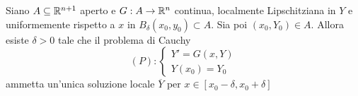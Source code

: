 \begin{theorem} \label{Teo: Esistenza e unicità locale}
    Siano $A \subseteq \mathbb{R}^{n+1}$ aperto e $G:A \to \mathbb{R}^n$ continua, localmente Lipschitziana in $Y$ e uniformemente rispetto a $x$ in $B_\delta(x_0, y_0) \subset A$. Sia poi $(x_0, Y_0) \in A$. Allora esiste $\delta>0$ tale che il problema di Cauchy
    \begin{equation}
        (P): \begin{cases}
            Y'=G(x, Y)\\
            Y(x_0)=Y_0
        \end{cases}
    \end{equation}
    ammetta un'unica soluzione locale $\overline{Y}$ per $x \in [x_0-\delta, x_0+\delta]$
\end{theorem}
